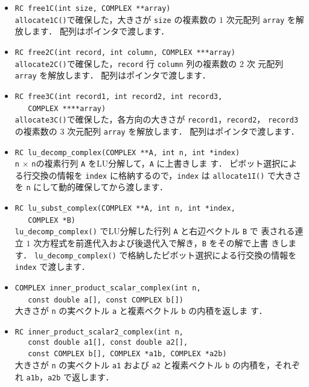 \begin{itemize}
\item \verb|RC free1C(int size, COMPLEX **array)| \ \\
\verb|allocate1C()|で確保した，大きさが \verb|size| の複素数の $1$ 次元配列 
\verb|array| を解放します．
配列はポインタで渡します．

\item \verb|RC free2C(int record, int column, COMPLEX ***array)| \ \\
\verb|allocate2C()|で確保した，\verb|record| 行 \verb|column| 列の複素数の $2$ 次
元配列 \verb|array| を解放します．
配列はポインタで渡します．

\item \verb|RC free3C(int record1, int record2, int record3, | \\
	\verb|   COMPLEX ****array)| \ \\
\verb|allocate3C()|で確保した，各方向の大きさが \verb|record1|，\verb|record2|，
\verb|record3| の複素数の $3$ 次元配列 \verb|array| を解放します．
配列はポインタで渡します．

\item \verb|RC lu_decomp_complex(COMPLEX **A, int n, int *index)| \ \\
\verb|n| $\times$ \verb|n|の複素行列 \verb|A| をLU分解して，\verb|A| に上書きしま
す．
ピボット選択による行交換の情報を \verb|index| に格納するので，\verb|index| は
\verb|allocate1I()| で大きさを \verb|n| にして動的確保してから渡します．

\item \verb|RC lu_subst_complex(COMPLEX **A, int n, int *index, | \\
	\verb|   COMPLEX *B)| \ \\
\verb|lu_decomp_complex()| でLU分解した行列 \verb|A| と右辺ベクトル \verb|B| で
表される連立 $1$ 次方程式を前進代入および後退代入で解き，\verb|B| をその解で上書
きします．
\verb|lu_decomp_complex()| で格納したピボット選択による行交換の情報を 
\verb|index| で渡します．

\item \verb|COMPLEX inner_product_scalar_complex(int n, | \\
	\verb|   const double a[], const COMPLEX b[])| \ \\
大きさが \verb|n| の実ベクトル \verb|a| と複素ベクトル \verb|b| の内積を返しま
す．

\item \verb|RC inner_product_scalar2_complex(int n, | \\
	\verb|   const double a1[], const double a2[], | \\
	\verb|   const COMPLEX b[], COMPLEX *a1b, COMPLEX *a2b)| \ \\
大きさが \verb|n| の実ベクトル \verb|a1| および \verb|a2| と複素ベクトル 
\verb|b| の内積を，それぞれ \verb|a1b|，\verb|a2b| で返します．


\end{itemize}
